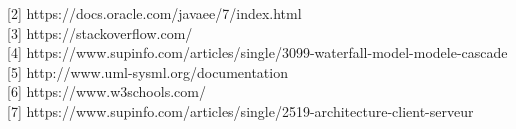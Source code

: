 \documentclass[11.5pt]{report}
\begin{document}
[2]     https://docs.oracle.com/javaee/7/index.html\\

[3]    https://stackoverflow.com/ \\

[4]    https://www.supinfo.com/articles/single/3099-waterfall-model-modele-cascade \\

[5]   http://www.uml-sysml.org/documentation \\

[6]    https://www.w3schools.com/\\

[7]     https://www.supinfo.com/articles/single/2519-architecture-client-serveur \\  
\end{document}
